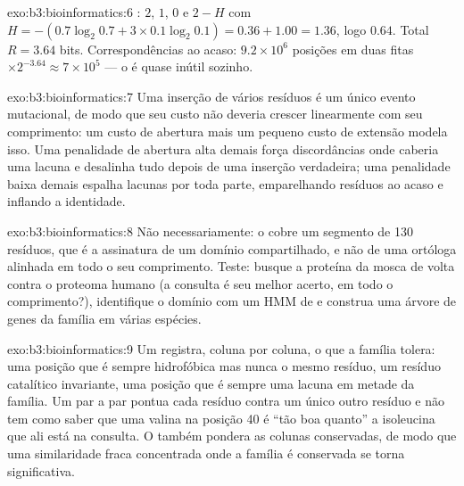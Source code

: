 \begin{solution}{exo:b3:bioinformatics:6}
: $2$, $1$, $0$ e $2 - H$ com $H = -(0.7\log_{2}
0.7 + 3\times 0.1\log_{2} 0.1) = 0.36 + 1.00 = 1.36$, logo $0.64$.
Total $R = 3.64$ bits. Correspondências ao acaso: $9.2\times 10^{6}$
posições em duas fitas $\times 2^{-3.64} \approx 7\times 10^{5}$ --- o
 é quase inútil sozinho.
\end{solution}

\begin{solution}{exo:b3:bioinformatics:7}
Uma inserção de vários resíduos é um único evento mutacional, de modo
que seu custo não deveria crescer linearmente com seu comprimento: um
custo de abertura mais um pequeno custo de extensão modela isso. Uma
penalidade de abertura alta demais força discordâncias onde caberia uma
lacuna e desalinha tudo depois de uma inserção verdadeira; uma
penalidade baixa demais espalha lacunas por toda parte, emparelhando
resíduos ao acaso e inflando a identidade.
\end{solution}

\begin{solution}{exo:b3:bioinformatics:8}
Não necessariamente: o  cobre um segmento de \num{130}
resíduos, que é a assinatura de um domínio compartilhado, e não de uma
ortóloga alinhada em todo o seu comprimento. Teste: busque a proteína
da mosca de volta contra o proteoma humano (a consulta é seu melhor
acerto, em todo o comprimento?), identifique o domínio com um HMM de
 e construa uma árvore de genes da família em várias espécies.
\end{solution}

\begin{solution}{exo:b3:bioinformatics:9}
Um  registra, coluna por coluna, o que a família tolera: uma
posição que é sempre hidrofóbica mas nunca o mesmo resíduo, um resíduo
catalítico invariante, uma posição que é sempre uma lacuna em metade da
família. Um  par a par pontua cada resíduo contra um único
outro resíduo e não tem como saber que uma valina na posição 40 é ``tão
boa quanto'' a isoleucina que ali está na consulta. O  também
pondera as colunas conservadas, de modo que uma similaridade fraca
concentrada onde a família é conservada se torna significativa.
\end{solution}

